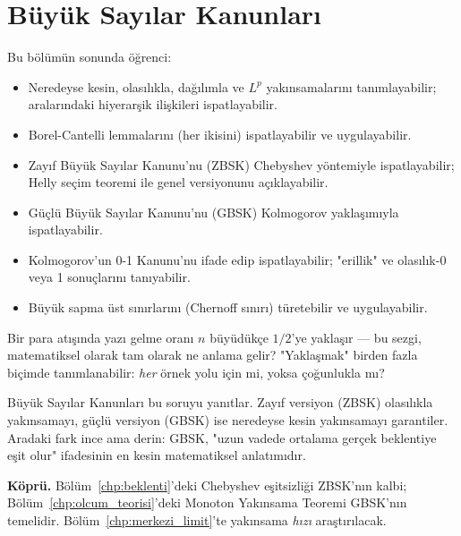 \chapter{Büyük Sayılar Kanunları}
\label{chp:buyuk_sayilar}


\begin{kazanimlar}
Bu bölümün sonunda öğrenci:
\begin{itemize}
  \item Neredeyse kesin, olasılıkla, dağılımla ve $L^p$ yakınsamalarını tanımlayabilir;
        aralarındaki hiyerarşik ilişkileri ispatlayabilir.
  \item Borel-Cantelli lemmalarını (her ikisini) ispatlayabilir ve uygulayabilir.
  \item Zayıf Büyük Sayılar Kanunu'nu (ZBSK) Chebyshev yöntemiyle ispatlayabilir;
        Helly seçim teoremi ile genel versiyonunu açıklayabilir.
  \item Güçlü Büyük Sayılar Kanunu'nu (GBSK) Kolmogorov yaklaşımıyla ispatlayabilir.
  \item Kolmogorov'un 0-1 Kanunu'nu ifade edip ispatlayabilir;
        "erillik" ve olasılık-0 veya 1 sonuçlarını tanıyabilir.
  \item Büyük sapma üst sınırlarını (Chernoff sınırı) türetebilir ve uygulayabilir.
\end{itemize}
\end{kazanimlar}

\begin{motivasyon}
Bir para atışında yazı gelme oranı $n$ büyüdükçe $1/2$'ye yaklaşır --- bu sezgi,
matematiksel olarak tam olarak ne anlama gelir? "Yaklaşmak" birden fazla biçimde
tanımlanabilir: \emph{her} örnek yolu için mi, yoksa çoğunlukla mı?

Büyük Sayılar Kanunları bu soruyu yanıtlar. Zayıf versiyon (ZBSK) olasılıkla
yakınsamayı, güçlü versiyon (GBSK) ise neredeyse kesin yakınsamayı garantiler.
Aradaki fark ince ama derin: GBSK, "uzun vadede ortalama gerçek beklentiye eşit
olur" ifadesinin en kesin matematiksel anlatımıdır.

\medskip
\textbf{Köprü.} Bölüm~\ref{chp:beklenti}'deki Chebyshev eşitsizliği ZBSK'nın
kalbi; Bölüm~\ref{chp:olcum_teorisi}'deki Monoton Yakınsama Teoremi GBSK'nın
temelidir. Bölüm~\ref{chp:merkezi_limit}'te yakınsama \emph{hızı} araştırılacak.
\end{motivasyon}


